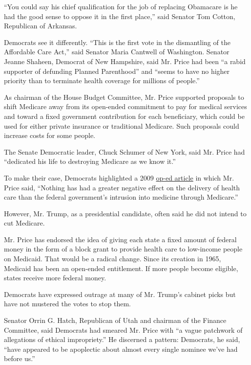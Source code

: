``You could say his chief qualification for the job of replacing
Obamacare is he had the good sense to oppose it in the first place,''
said Senator Tom Cotton, Republican of Arkansas.

Democrats see it differently. ``This is the first vote in the
dismantling of the Affordable Care Act,'' said Senator Maria Cantwell of
Washington. Senator Jeanne Shaheen, Democrat of New Hampshire, said Mr.
Price had been ``a rabid supporter of defunding Planned Parenthood'' and
``seems to have no higher priority than to terminate health coverage for
millions of people.''

As chairman of the House Budget Committee, Mr. Price supported proposals
to shift Medicare away from its open-ended commitment to pay for medical
services and toward a fixed government contribution for each
beneficiary, which could be used for either private insurance or
traditional Medicare. Such proposals could increase costs for some
people.

The Senate Democratic leader, Chuck Schumer of New York, said Mr. Price
had ``dedicated his life to destroying Medicare as we know it.''

To make their case, Democrats highlighted a 2009
\href{http://www.politico.com/story/2009/07/how-the-gop-wants-to-fix-health-care-025581?paginate=false}{op-ed
article} in which Mr. Price said, ``Nothing has had a greater negative
effect on the delivery of health care than the federal government's
intrusion into medicine through Medicare.''

However, Mr. Trump, as a presidential candidate, often said he did not
intend to cut Medicare.

Mr. Price has endorsed the idea of giving each state a fixed amount of
federal money in the form of a block grant to provide health care to
low-income people on Medicaid. That would be a radical change. Since its
creation in 1965, Medicaid has been an open-ended entitlement. If more
people become eligible, states receive more federal money.

Democrats have expressed outrage at many of Mr. Trump's cabinet picks
but have not mustered the votes to stop them.

Senator Orrin G. Hatch, Republican of Utah and chairman of the Finance
Committee, said Democrats had smeared Mr. Price with ``a vague patchwork
of allegations of ethical impropriety.'' He discerned a pattern:
Democrats, he said, ``have appeared to be apoplectic about almost every
single nominee we've had before us.''

